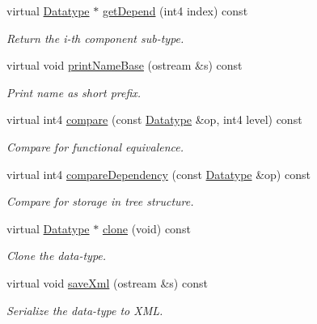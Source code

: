\begin{DoxyCompactItemize}
virtual \mbox{\hyperlink{class_datatype}{Datatype}} $\ast$ \mbox{\hyperlink{class_type_pointer_ac63c41e423f88eca13459135f86c7d32}{get\+Depend}} (int4 index) const
\begin{DoxyCompactList}\small\item\em Return the i-\/th component sub-\/type. \end{DoxyCompactList}\item 
virtual void \mbox{\hyperlink{class_type_pointer_a843f2ebe62187fe48a0f3d1b9bd9c10b}{print\+Name\+Base}} (ostream \&s) const
\begin{DoxyCompactList}\small\item\em Print name as short prefix. \end{DoxyCompactList}\item 
virtual int4 \mbox{\hyperlink{class_type_pointer_aba4a7c8c334a37a2225ec32c7328e402}{compare}} (const \mbox{\hyperlink{class_datatype}{Datatype}} \&op, int4 level) const
\begin{DoxyCompactList}\small\item\em Compare for functional equivalence. \end{DoxyCompactList}\item 
virtual int4 \mbox{\hyperlink{class_type_pointer_a20dfb07c24c08242c21ae856508197fe}{compare\+Dependency}} (const \mbox{\hyperlink{class_datatype}{Datatype}} \&op) const
\begin{DoxyCompactList}\small\item\em Compare for storage in tree structure. \end{DoxyCompactList}\item 
virtual \mbox{\hyperlink{class_datatype}{Datatype}} $\ast$ \mbox{\hyperlink{class_type_pointer_acb36f99677bfbe269f7bfca663f81618}{clone}} (void) const
\begin{DoxyCompactList}\small\item\em Clone the data-\/type. \end{DoxyCompactList}\item 
virtual void \mbox{\hyperlink{class_type_pointer_adee39f5a617b1133d7a701cda30d154b}{save\+Xml}} (ostream \&s) const
\begin{DoxyCompactList}\small\item\em Serialize the data-\/type to X\+ML. \end{DoxyCompactList}\end{DoxyCompactItemize}
